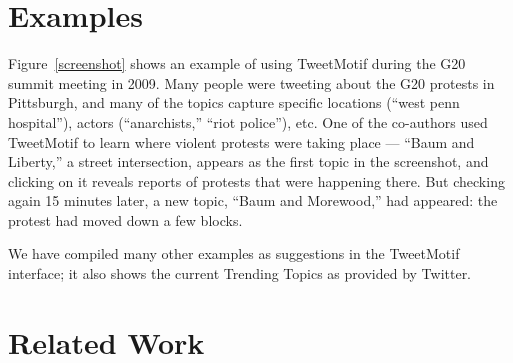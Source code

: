 \documentclass[letterpaper]{article}
\newcommand{\mikeyk}[1]{\textcolor{green}{\textbf{[#1 --mikeyk]}}}
\begin{document}


\section{Examples}

Figure~\ref{screenshot} shows an example of using TweetMotif during the G20 summit meeting in 2009.  Many people were tweeting about the G20 protests in Pittsburgh, and many of the topics capture specific locations (``west penn hospital''), actors (``anarchists,'' ``riot police''), etc.  One of the co-authors used TweetMotif to learn where violent protests were taking place --- ``Baum and Liberty,'' a street intersection, appears as the first topic in the screenshot, and clicking on it reveals reports of protests that were happening there.  But checking again 15 minutes later, a new topic,  ``Baum and Morewood,'' had appeared: the protest had moved down a few blocks.

We have compiled many other examples as suggestions in the TweetMotif interface; it also shows the current Trending Topics as provided by Twitter.

%

\section{Related Work}



\end{document}
